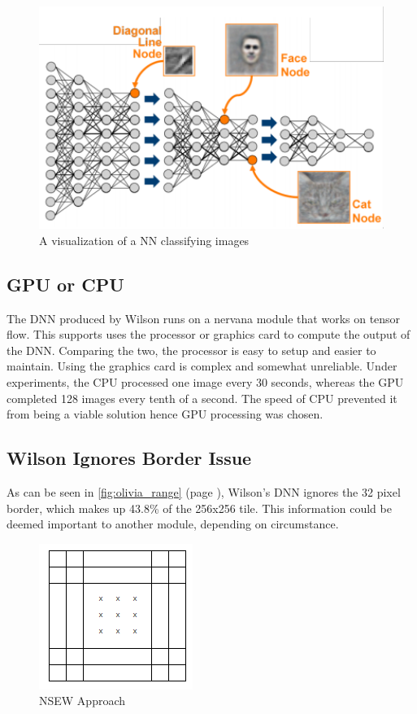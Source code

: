 \begin{figure}[H]
    \centering
    \includegraphics[width=12cm]{figs/7/NN_decomp}
    \caption{A visualization of a NN classifying images \citep{murnane_2016}}
    \label{fig:NN_decomp}
\end{figure}
	
\subsection{GPU or CPU}

The DNN produced by Wilson runs on a nervana module that works on tensor flow. This supports uses the processor or graphics card to compute the output of the DNN. Comparing the two, the processor is easy to setup and easier to maintain. Using the graphics card is complex and somewhat unreliable. Under experiments, the CPU processed one image every 30 seconds, whereas the GPU completed 128 images every tenth of a second. The speed of CPU prevented it from being a viable solution hence GPU processing was chosen. 

\subsection{Wilson Ignores Border Issue} \label{section:nsew}

As can be seen in \ref{fig:olivia_range} (page \pageref{fig:olivia_range}), Wilson’s DNN ignores the 32 pixel border, which makes up 43.8\% of the 256x256 tile. This information could be deemed important to another module, depending on circumstance. 

\begin{figure}[H]
    \centering
    \includegraphics[width=5cm]{figs/7/NSEW_points}
    \caption{NSEW Approach}
    \label{fig:NSEW}
\end{figure}

